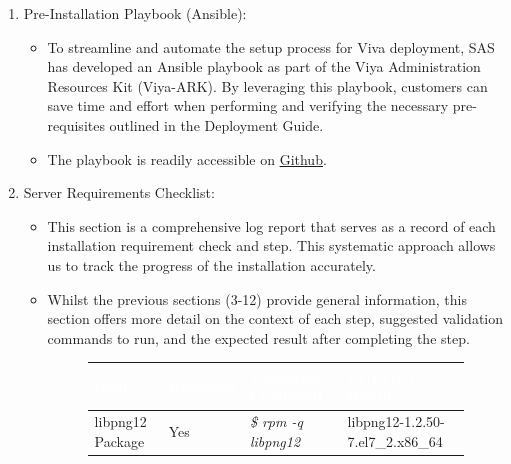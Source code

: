 \begin{enumerate}
\begin{itemize}
    \end{itemize}
    \item Pre-Installation Playbook (Ansible):
    \begin{itemize}
        \item To streamline and automate the setup process for Viva deployment, SAS has developed an Ansible playbook as part of the Viya Administration Resources Kit (Viya-ARK). By leveraging this playbook, customers can save time and effort when performing and verifying the necessary pre-requisites outlined in the Deployment Guide.
        \item The playbook is readily accessible on \href{https://github.com/sassoftware/viya-ark}{Github}. 
    \end{itemize}
    \item Server Requirements Checklist:
    \begin{itemize}
        \item This section is a comprehensive log report that serves as a record of each installation requirement check and step. This systematic approach allows us to track the progress of the installation accurately. 
        \item Whilst the previous sections (3-12) provide general information, this section offers more detail on the context of each step, suggested validation commands to run, and the expected result after completing the step.
            \begin{figure}[H]
            \begin{center}
            \renewcommand{\arraystretch}{1.5}
            \begin{tabular}{|>{\raggedright\arraybackslash}l
                            |>{\raggedright\arraybackslash}l
                            |>{\raggedright\arraybackslash}l
                            |>{\raggedright\arraybackslash}l
                            |}
            \hline
            \rowcolor[HTML]{196fb4}\centering\textcolor{white}{\large Item} 
                                    & \centering\textcolor{white}{\large Reviewed}
                                    & \centering\textcolor{white}{\large Validation Command}
                                    & \centering\textcolor{white}{\large Expected Result}
                                    \tabularnewline 
            \hline
            libpng12 Package & Yes & \emph{\$ rpm -q libpng12} & libpng12-1.2.50-7.el7\_2.x86\_64 \\\hline

\end{tabular}
\end{center}
\end{figure}
\end{itemize}
\end{enumerate}
